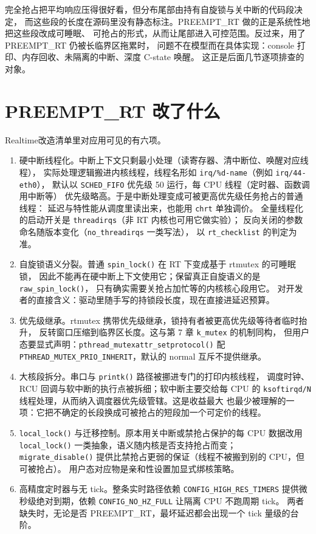 \documentclass[12pt,a4paper,fontset=fandol]{ctexbook}
\newcommand{\Fn}[1]{\texttt{#1()}}
\newcommand{\Tp}[1]{\texttt{#1}}
\newcommand{\Lang}[1]{\textsf{#1}}
\newcommand{\DomRT}{\Lang{Realtime}}
\begin{document}
完全抢占把平均响应压得很好看，但分布尾部由持有自旋锁与关中断的代码段决定，
而这些段的长度在源码里没有静态标注。PREEMPT\_RT 做的正是系统性地把这些段改成可睡眠、
可抢占的形式，从而让尾部进入可控范围。反过来，用了 PREEMPT\_RT 仍被长临界区拖累时，
问题不在模型而在具体实现：console 打印、内存回收、未隔离的中断、深度 C-state 唤醒。
这正是后面几节逐项排查的对象。

\section{PREEMPT\_RT 改了什么}
\label{sec:ch08-rt-changes}

\DomRT{}改造清单里对应用可见的有六项。

\begin{enumerate}
  \item 硬中断线程化。中断上下文只剩最小处理（读寄存器、清中断位、唤醒对应线程），
        实际处理逻辑搬进内核线程，线程名形如 \Tp{irq/\%d-name}（例如 \Tp{irq/44-eth0}），
        默认以 \Tp{SCHED\_FIFO} 优先级 50 运行，每 CPU 线程（定时器、函数调用中断等）
        优先级略高。于是中断处理变成可被更高优先级任务抢占的普通线程：
        延迟与特性能从调度里读出来，也能用 \Tp{chrt} 单独调价。
        全量线程化的启动开关是 \Tp{threadirqs}（非 RT 内核也可用它做实验）；
        反向关闭的参数命名随版本变化（\Tp{no\_threadirqs} 一类写法），
        以 \Tp{rt\_checklist} 的判定为准。
  \item 自旋锁语义分裂。普通 \Fn{spin\_lock} 在 RT 下变成基于 rtmutex 的可睡眠锁，
        因此不能再在硬中断上下文使用它；保留真正自旋语义的是 \Fn{raw\_spin\_lock}，
        只有确实需要关抢占加忙等的内核核心段用它。
        对开发者的直接含义：驱动里随手写的持锁段长度，现在直接进延迟预算。
  \item 优先级继承。rtmutex 携带优先级继承，锁持有者被更高优先级等待者临时抬升，
        反转窗口压缩到临界区长度。这与第 7 章 \Tp{k\_mutex} 的机制同构，
        但用户态要显式声明：\Fn{pthread\_mutexattr\_setprotocol} 配
        \Tp{PTHREAD\_MUTEX\_PRIO\_INHERIT}，默认的 normal 互斥不提供继承。
  \item 大核段拆分。串口与 \Fn{printk} 路径被挪进专门的打印内核线程，
        调度时钟、RCU 回调与软中断的执行点被拆细；软中断主要交给每 CPU 的
        \Tp{ksoftirqd/N} 线程处理，从而纳入调度器优先级管辖。这是收益最大
        也最少被理解的一项：它把不确定的长段换成可被抢占的短段加一个可定价的线程。
  \item \Fn{local\_lock} 与迁移控制。原本用关中断或禁抢占保护的每 CPU 数据改用
        \Fn{local\_lock} 一类抽象，语义随内核是否支持抢占而变；
        \Fn{migrate\_disable} 提供比禁抢占更弱的保证（线程不被搬到别的 CPU，但可被抢占）。
        用户态对应物是亲和性设置加显式绑核策略。
  \item 高精度定时器与无 tick。整条实时路径依赖 \Tp{CONFIG\_HIGH\_RES\_TIMERS}
        提供微秒级绝对到期，依赖 \Tp{CONFIG\_NO\_HZ\_FULL} 让隔离 CPU 不跑周期 tick。
        两者缺失时，无论是否 PREEMPT\_RT，最坏延迟都会出现一个 tick 量级的台阶。
\end{enumerate}
\end{document}

